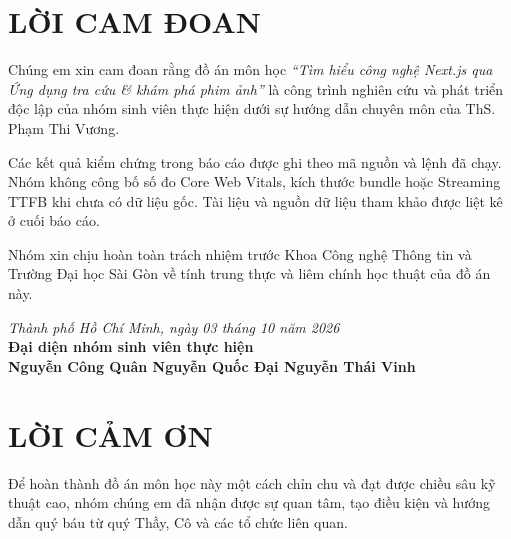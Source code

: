 \documentclass[12pt,a4paper]{extarticle}
\begin{document}
\newpage
{}

\section*{LỜI CAM ĐOAN}
{}

Chúng em xin cam đoan rằng đồ án môn học \textit{``Tìm hiểu công nghệ Next.js qua Ứng dụng tra cứu \& khám phá phim ảnh''} là công trình nghiên cứu và phát triển độc lập của nhóm sinh viên thực hiện dưới sự hướng dẫn chuyên môn của ThS. Phạm Thi Vương.

Các kết quả kiểm chứng trong báo cáo được ghi theo mã nguồn và lệnh đã chạy. Nhóm không công bố số đo Core Web Vitals, kích thước bundle hoặc Streaming TTFB khi chưa có dữ liệu gốc. Tài liệu và nguồn dữ liệu tham khảo được liệt kê ở cuối báo cáo.

Nhóm xin chịu hoàn toàn trách nhiệm trước Khoa Công nghệ Thông tin và Trường Đại học Sài Gòn về tính trung thực và liêm chính học thuật của đồ án này.

\vspace{1.5cm}
\begin{flushright}
    \textit{Thành phố Hồ Chí Minh, ngày 03 tháng 10 năm 2026}\\[0.3cm]
    \textbf{Đại diện nhóm sinh viên thực hiện}\\[1.5cm]
    \textbf{Nguyễn Công Quân \hspace{1cm} Nguyễn Quốc Đại \hspace{1cm} Nguyễn Thái Vinh}
\end{flushright}

\newpage

\section*{LỜI CẢM ƠN}
{}

Để hoàn thành đồ án môn học này một cách chỉn chu và đạt được chiều sâu kỹ thuật cao, nhóm chúng em đã nhận được sự quan tâm, tạo điều kiện và hướng dẫn quý báu từ quý Thầy, Cô và các tổ chức liên quan.
\end{document}
